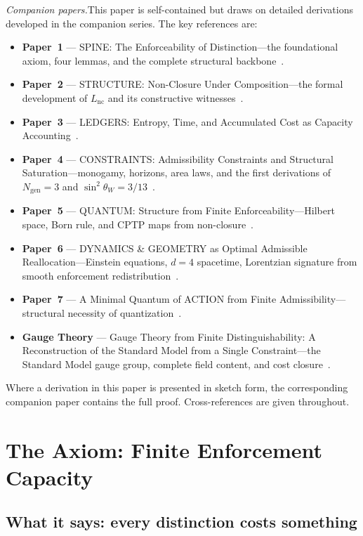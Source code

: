 \documentclass[11pt]{article}
\begin{document}
\medskip
\noindent\textit{Companion papers.}\quad This paper is self-contained but draws on detailed derivations developed in the companion series.  The key references are:

\smallskip
\begin{itemize}[nosep,leftmargin=2em]
\item \textbf{Paper~1} --- SPINE: The Enforceability of Distinction---the foundational axiom, four lemmas, and the complete structural backbone~\cite{P1}.
\item \textbf{Paper~2} --- STRUCTURE: Non-Closure Under Composition---the formal development of $L_{\mathrm{nc}}$ and its constructive witnesses~\cite{P2}.
\item \textbf{Paper~3} --- LEDGERS: Entropy, Time, and Accumulated Cost as Capacity Accounting~\cite{P3}.
\item \textbf{Paper~4} --- CONSTRAINTS: Admissibility Constraints and Structural Saturation---monogamy, horizons, area laws, and the first derivations of $N_{\mathrm{gen}}=3$ and $\sin^2\!\theta_W = 3/13$~\cite{P4}.
\item \textbf{Paper~5} --- QUANTUM: Structure from Finite Enforceability---Hilbert space, Born rule, and CPTP maps from non-closure~\cite{P5}.
\item \textbf{Paper~6} --- DYNAMICS \& GEOMETRY as Optimal Admissible Reallocation---Einstein equations, $d=4$ spacetime, Lorentzian signature from smooth enforcement redistribution~\cite{P6}.
\item \textbf{Paper~7} --- A Minimal Quantum of ACTION from Finite Admissibility---structural necessity of quantization~\cite{P7}.
\item \textbf{Gauge Theory} --- Gauge Theory from Finite Distinguishability: A Reconstruction of the Standard Model from a Single Constraint---the Standard Model gauge group, complete field content, and cost closure~\cite{PGT}.
\end{itemize}
\smallskip

\noindent Where a derivation in this paper is presented in sketch form, the corresponding companion paper contains the full proof.  Cross-references are given throughout.


\section{The Axiom: Finite Enforcement Capacity}

\subsection{What it says: every distinction costs something}
\end{document}

